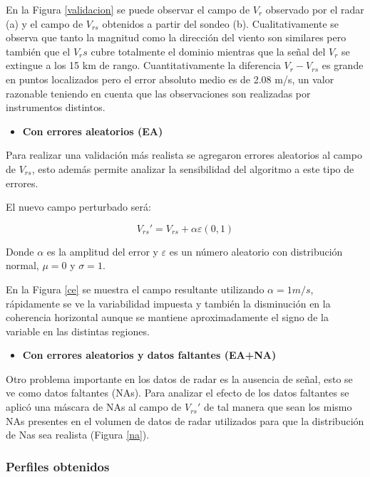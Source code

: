 \documentclass[12pt,spanish,oneside, a4paper]{book}
\providecommand{\tightlist}{%
  \setlength{\itemsep}{0pt}\setlength{\parskip}{0pt}}
\begin{document}
En la Figura \ref{validacion} se puede observar el campo de \(V_r\)
observado por el radar (a) y el campo de \(V_{rs}\) obtenidos a partir
del sondeo (b). Cualitativamente se observa que tanto la magnitud como
la dirección del viento son similares pero también que el \(V_rs\) cubre
totalmente el dominio mientras que la señal del \(V_r\) se extingue a
los 15 km de rango. Cuantitativamente la diferencia \(V_r - V_{rs}\) es
grande en puntos localizados pero el error absoluto medio es de 2.08
m/s, un valor razonable teniendo en cuenta que las observaciones son
realizadas por instrumentos distintos.

\begin{itemize}
\tightlist
\item
  \textbf{Con errores aleatorios (EA)}
\end{itemize}

Para realizar una validación más realista se agregaron errores
aleatorios al campo de \(V_{rs}\), esto además permite analizar la
sensibilidad del algoritmo a este tipo de errores.

El nuevo campo perturbado será:

\begin{equation} \label{eq-vr12}
V_{rs}'  = V_{rs} + \alpha \varepsilon(0,1)
\end{equation}

Donde \(\alpha\) es la amplitud del error y \(\varepsilon\) es un número
aleatorio con distribución normal, \(\mu = 0\) y \(\sigma= 1\).

En la Figura \ref{ce} se muestra el campo resultante utilizando
\(\alpha = 1 m/s\), rápidamente se ve la variabilidad impuesta y también
la disminución en la coherencia horizontal aunque se mantiene
aproximadamente el signo de la variable en las distintas regiones.

\begin{itemize}
\tightlist
\item
  \textbf{Con errores aleatorios y datos faltantes (EA+NA)}
\end{itemize}

Otro problema importante en los datos de radar es la ausencia de señal,
esto se ve como datos faltantes (NAs). Para analizar el efecto de los
datos faltantes se aplicó una máscara de NAs al campo de \(V_{rs}'\) de
tal manera que sean los mismo NAs presentes en el volumen de datos de
radar utilizados para que la distribución de Nas sea realista (Figura
\ref{na}).

\subsubsection{Perfiles obtenidos}\label{perfiles-obtenidos}
\end{document}
